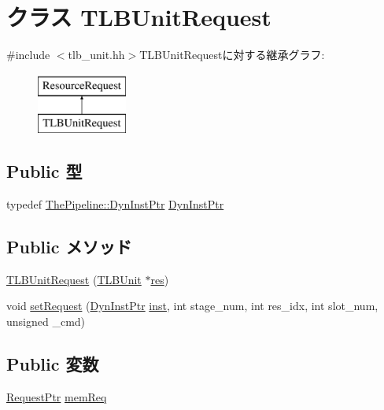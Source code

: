 \hypertarget{classTLBUnitRequest}{
\section{クラス TLBUnitRequest}
\label{classTLBUnitRequest}
}


{\ttfamily \#include $<$tlb\_\-unit.hh$>$}TLBUnitRequestに対する継承グラフ:\begin{figure}[H]
\begin{center}
\leavevmode
\includegraphics[height=2cm]{classTLBUnitRequest}
\end{center}
\end{figure}
\subsection*{Public 型}
\begin{DoxyCompactItemize}
\item 
typedef \hyperlink{classRefCountingPtr}{ThePipeline::DynInstPtr} \hyperlink{classTLBUnitRequest_af9d0c8a46736ba6aa2d8bb94da1a5e73}{DynInstPtr}
\end{DoxyCompactItemize}
\subsection*{Public メソッド}
\begin{DoxyCompactItemize}
\item 
\hyperlink{classTLBUnitRequest_aac7d9e75487ae54bc4450762c00ba15e}{TLBUnitRequest} (\hyperlink{classTLBUnit}{TLBUnit} $\ast$\hyperlink{classResourceRequest_ae6cb01f81685fa77e8716cdef5924b8a}{res})
\item 
void \hyperlink{classTLBUnitRequest_aff267a8ca11b384ffb71af061c690e2d}{setRequest} (\hyperlink{classRefCountingPtr}{DynInstPtr} \hyperlink{classResourceRequest_af5d4fb974eeb4507d4c837d365d0cefc}{inst}, int stage\_\-num, int res\_\-idx, int slot\_\-num, unsigned \_\-cmd)
\end{DoxyCompactItemize}
\subsection*{Public 変数}
\begin{DoxyCompactItemize}
\item 
\hyperlink{classRequest}{RequestPtr} \hyperlink{classTLBUnitRequest_a5520eb2f7c2cf4b0e109d6ffd6d2d053}{memReq}
\end{DoxyCompactItemize}


